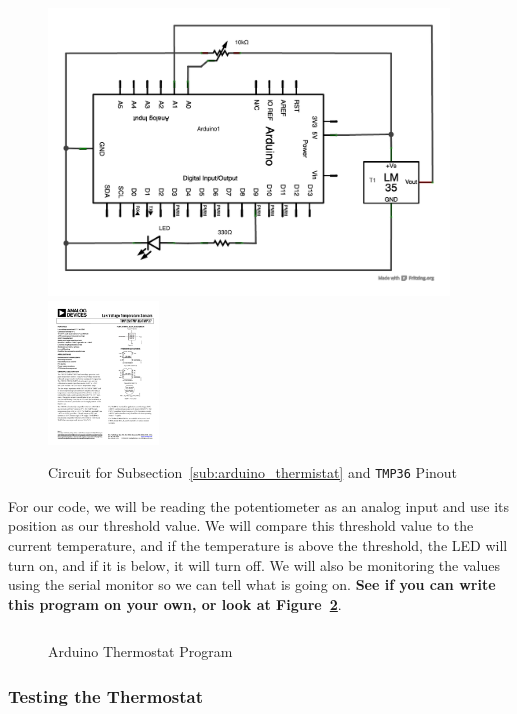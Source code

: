 \documentclass[11pt,a4paper]{article}
\begin{document}
\begin{figure}[htbp]
    \centering
        \includegraphics[height=3in]{figures/temp-led.pdf}\includegraphics[height=1.5in]{figures/tmp35.pdf}
        \caption{Circuit for Subsection~\ref{sub:arduino_thermistat} and \texttt{TMP36} Pinout}
    \label{fig:figures_temp-led}
\end{figure}

For our code, we will be reading the potentiometer as an analog input and use its position as our threshold value.  We will compare this threshold value to the current temperature, and if the temperature is above the threshold, the LED will turn on, and if it is below, it will turn off.  We will also be monitoring the values using the serial monitor so we can tell what is going on.  \textbf{See if you can write this program on your own, or look at Figure~\ref{fig:temp_led_code}}.

\begin{figure}[htbp]
	\centering
\inputminted[mathescape,linenos,numbersep=5pt,gobble=0,frame=lines,framesep=2mm]{c}{code/thermostat/thermostat.ino}
	\caption{Arduino Thermostat Program}
	\label{fig:temp_led_code}
\end{figure}

\subsubsection{Testing the Thermostat} %
\label{ssub:testing_the_thermostat}
\end{document}
